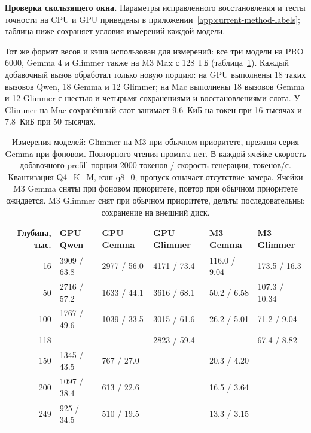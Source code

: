 \textbf{Проверка скользящего окна.} Параметры исправленного восстановления и тесты точности на CPU и GPU
приведены в приложении~\ref{app:current-method-labels}; таблица ниже сохраняет условия измерений каждой модели.

Тот же формат весов и кэша использован для измерений: все три модели на PRO 6000, Gemma 4 и Glimmer
также на M3 Max с 128~ГБ (таблица~\ref{tab:swa-measured}). Каждый добавочный вызов обработал
только новую порцию: на GPU выполнены 18 таких вызовов Qwen, 18 Gemma и 12 Glimmer;
на Mac выполнены 18 вызовов Gemma и 12 Glimmer с шестью и четырьмя сохранениями и восстановлениями слота.
У Glimmer на Mac сохранённый слот занимает 9.6~КиБ на токен при 16 тысячах и 7.8~КиБ при 50 тысячах.

\begin{table}[t]
\centering
\caption{Измерения моделей: Glimmer на M3 при обычном приоритете, прежняя серия Gemma при фоновом. Повторного чтения промпта нет. В каждой ячейке скорость
добавочного prefill порции 2000 токенов / скорость генерации, токенов/с.
Квантизация Q4\_K\_M, кэш q8\_0; пропуск означает отсутствие замера. Ячейки M3 Gemma сняты при фоновом приоритете, повтор при обычном приоритете ожидается. M3 Glimmer снят при обычном приоритете, дельты последовательны; сохранение на внешний диск.}
\label{tab:swa-measured}
\footnotesize
\begin{tabular}{rlllll}
\toprule
Глубина, тыс. & GPU Qwen & GPU Gemma & GPU Glimmer & M3 Gemma & M3 Glimmer \\
\midrule
16 & 3909 / 63.8 & 2977 / 56.0 & 4171 / 73.4 & 116.0 / 9.04 & 173.5 / 16.3 \\
50 & 2716 / 57.2 & 1633 / 44.1 & 3616 / 68.1 & 50.2 / 6.58 & 107.3 / 10.34 \\
100 & 1767 / 49.6 & 1039 / 33.5 & 3015 / 61.6 & 26.2 / 5.01 & 71.2 / 9.04 \\
118 & & & 2823 / 59.4 & & 67.4 / 8.82 \\
150 & 1345 / 43.5 & 767 / 27.0 & & 20.3 / 4.20 & \\
200 & 1097 / 38.4 & 613 / 22.6 & & 16.5 / 3.64 & \\
249 & 925 / 34.5 & 510 / 19.5 & & 13.3 / 3.15 & \\
\bottomrule
\end{tabular}
\end{table}


